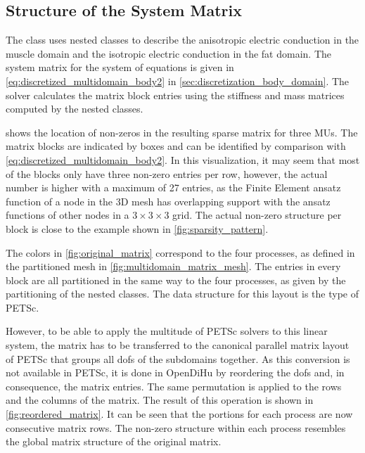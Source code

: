 \subsection{Structure of the System Matrix}

The  class uses nested  classes to describe the anisotropic electric conduction in the muscle domain and the isotropic electric conduction in the fat domain.
The system matrix for the system of equations is given in \cref{eq:discretized_multidomain_body2} in \cref{sec:discretization_body_domain}. 
The solver calculates the matrix block entries using the stiffness and mass matrices computed by the nested  classes.

 shows the location of non-zeros in the resulting sparse matrix for three MUs. The matrix blocks are indicated by boxes and can be identified by comparison with \cref{eq:discretized_multidomain_body2}. In this visualization, it may seem that most of the blocks only have three non-zero entries per row, however, the actual number is higher with a maximum of 27 entries, as the Finite Element ansatz function of a node in the 3D mesh has overlapping support with the ansatz functions of other nodes in a $3\times 3 \times 3$ grid.
The actual non-zero structure per block is close to the example shown in \cref{fig:sparsity_pattern}.

The colors in \cref{fig:original_matrix} correspond to the four processes, as defined in the partitioned mesh in \cref{fig:multidomain_matrix_mesh}. 
The entries in every block are all partitioned in the same way to the four processes, as given by the partitioning of the nested  classes. The data structure for this layout is the  type of PETSc. 

However, to be able to apply the multitude of PETSc solvers to this linear system, the matrix has to be transferred to the canonical parallel matrix layout of PETSc that groups all dofs of the subdomains together. As this conversion is not available in PETSc, it is done in OpenDiHu by reordering the dofs and, in consequence, the matrix entries. The same permutation is applied to the rows and the columns of the matrix. The result of this operation is shown in \cref{fig:reordered_matrix}. It can be seen that the portions for each process are now consecutive matrix rows. The non-zero structure within each process resembles the global matrix structure of the original matrix.

